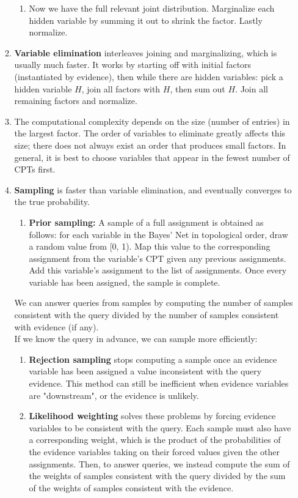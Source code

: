 \documentclass[10pt]{article}
\begin{document}
\begin{multicols}{2}
\begin{enumerate}
\begin{enumerate}
\begin{enumerate}
            \item Now we have the full relevant joint distribution. Marginalize each hidden variable by summing it out to shrink the factor. Lastly normalize.
        \end{enumerate}
        \item \textbf{Variable elimination} interleaves joining and marginalizing, which is usually much faster. It works by starting off with initial factors (instantiated by evidence), then while there are hidden variables: pick a hidden variable $H$, join all factors with $H$, then sum out $H$. Join all remaining factors and normalize.
        \item The computational complexity depends on the size (number of entries) in the largest factor. The order of variables to eliminate greatly affects this size; there does not always exist an order that produces small factors. In general, it is best to choose variables that appear in the fewest number of CPTs first.
        \item \textbf{Sampling} is faster than variable elimination, and eventually converges to the true probability.
        \begin{enumerate}
            \item \textbf{Prior sampling:} A sample of a full assignment is obtained as follows: for each variable in the Bayes' Net in topological order, draw a random value from [0, 1). Map this value to the corresponding assignment from the variable's CPT given any previous assignments. Add this variable's assignment to the list of assignments. Once every variable has been assigned, the sample is complete.
        \end{enumerate}
        We can answer queries from samples by computing the number of samples consistent with the query divided by the number of samples consistent with evidence (if any). \\
        If we know the query in advance, we can sample more efficiently:
        \begin{enumerate}
            \item \textbf{Rejection sampling} stops computing a sample once an evidence variable has been assigned a value inconsistent with the query evidence. This method can still be inefficient when evidence variables are "downstream", or the evidence is unlikely.
            \item \textbf{Likelihood weighting} solves these problems by forcing evidence variables to be consistent with the query. Each sample must also have a corresponding weight, which is the product of the probabilities of the evidence variables taking on their forced values given the other assignments. Then, to answer queries, we instead compute the sum of the weights of samples consistent with the query divided by the sum of the weights of samples consistent with the evidence.

\end{enumerate}
\end{enumerate}
\end{enumerate}
\end{multicols}
\end{document}
